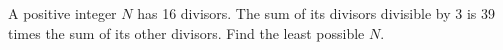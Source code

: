 A positive integer $N$ has 16 divisors. The sum of its divisors divisible by 3 is 39 times the sum of its other divisors. Find the least possible $N$.
